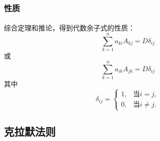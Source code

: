 \subsubsection{性质}
\paragraph{}
综合定理和推论，得到代数余子式的性质：
\begin{equation*}
  \sum_{k=1}^na_{ki}A_{kj} = D\delta_{ij}
\end{equation*}
或
\begin{equation*}
  \sum_{k=1}^na_{ik}A_{jk} = D\delta_{ij}
\end{equation*}
其中
\begin{equation*}
  \delta_{ij} = \left\{\begin{array}{cc}
    1, & \text{当$i=j$}, \\
    0, & \text{当$i\neq j$}.
  \end{array}\right.
\end{equation*}

\subsection{克拉默法则}
